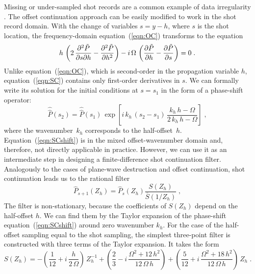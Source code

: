   Missing or under-sampled shot records are a common example of data
  irregularity \cite{Crawley.sepphd.104}. The offset continuation
  approach can be easily modified to work in the shot record domain.
  With the change of variables $s = y - h$, where $s$ is the shot
  location, the frequency-domain equation~(\ref{eqn:OC}) transforms to
  the equation
  \begin{equation}
    h \, \left( 2\,{\partial^2 \tilde{P} \over \partial s \partial h} - 
      {\partial^2 \tilde{P} \over \partial h^2} \right) - 
    i\,\Omega \, \left({\partial \tilde{P} \over   {\partial h}} -
        {\partial \tilde{P} \over   {\partial s}}\right) = 0 \;.
    \label{eqn:SC} 
  \end{equation}
  Unlike equation~(\ref{eqn:OC}), which is second-order in the
  propagation variable $h$, equation~(\ref{eqn:SC}) contains only
  first-order derivatives in $s$. We can formally write its solution
  for the initial conditions at $s=s_1$ in the form of a phase-shift
  operator:
    \begin{equation}     
      \widehat{\widehat{P}}(s_2) = \widehat{\widehat{P}}(s_1)\,
      \exp{\left[i\,k_h\,\left(s_2-s_1\right)\,
          \frac{k_h\,h-\Omega}{2\,k_h\,h-\Omega}\right]}\;,
    \label{eqn:SCshift} 
  \end{equation}
  where the wavenumber~$k_h$ corresponds to the half-offset~$h$.
  Equation~(\ref{eqn:SCshift}) is in the mixed offset-wavenumber
  domain and, therefore, not directly applicable in practice. However,
  we can use it as an intermediate step in designing a
  finite-difference shot continuation filter. Analogously to the cases
  of plane-wave destruction and offset continuation, shot continuation
  leads us to the rational filter
  \begin{equation}
    \label{eqn:SCpass}
    \hat{P}_{s+1}(Z_h) = 
    \hat{P}_{s} (Z_h) \frac{S(Z_h)}{\bar{S}(1/Z_h)}\;,
  \end{equation}
  The filter is non-stationary, because the coefficients of $S(Z_h)$
  depend on the half-offset $h$. We can find them by the Taylor
  expansion of the phase-shift equation~(\ref{eqn:SCshift}) around
  zero wavenumber $k_h$. For the case of the half-offset sampling
  equal to the shot sampling, the simplest three-point filter is
  constructed with three terms of the Taylor expansion. It takes the
  form
  \begin{equation}
    \label{eqn:SCfilt}
    S(Z_h) = - \left(\frac{1}{12} + i\,\frac{h}{2\,\Omega}\right)\,Z_h^{-1} + 
    \left(\frac{2}{3} - i\,\frac{\Omega^2 + 12\,h^2}{12\,\Omega\,h}\right) +
    \left(\frac{5}{12} + i\,\frac{\Omega^2 + 18\,h^2}{12\,\Omega\,h}\right)\,
    Z_h\;.
  \end{equation}
  
